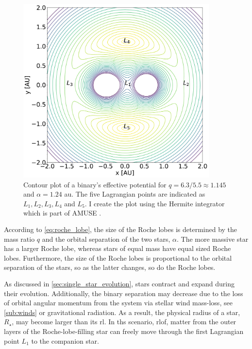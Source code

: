 \begin{figure}[H]
    \centering
    \includegraphics[width=0.9\textwidth]{Thesis/graphs/binary_equop.pdf}
    \caption{Contour plot of a binary's effective potential for $q=6.3/5.5 \approx 1.145$ and $\alpha = 1.24$ au. The five Lagrangian points are indicated as $L_1, L_2, L_3, L_4$ and $L_5$. I create the plot using the Hermite integrator which is part of AMUSE \citep{hut1995building}.}
    \label{fig:binary_equop}
\end{figure}
According to \cref{eq:roche_lobe}, the size of the Roche lobes is determined by the mass ratio $q$ and the orbital separation of the two stars, $\alpha$. The more massive star has a larger Roche lobe, whereas stars of equal mass have equal sized Roche lobes. Furthermore, the size of the Roche lobes is proportional to the orbital separation of the stars, so as the latter changes, so do the Roche lobes.

As discussed in \cref{sec:single_star_evolution}, stars contract and expand during their evolution. Additionally, the binary separation may decrease due to the loss of orbital angular momentum from the system via stellar wind mass-loss, see \cref{sub:winds} or gravitational radiation. As a result, the physical radius of a star, $R_{\star}$, may become larger than its \ac{rl}. In ths scenario, \ac{rlof,} matter from the outer layers of the Roche-lobe-filling star can freely move through the first Lagrangian point $L_1$ to the companion star. 

